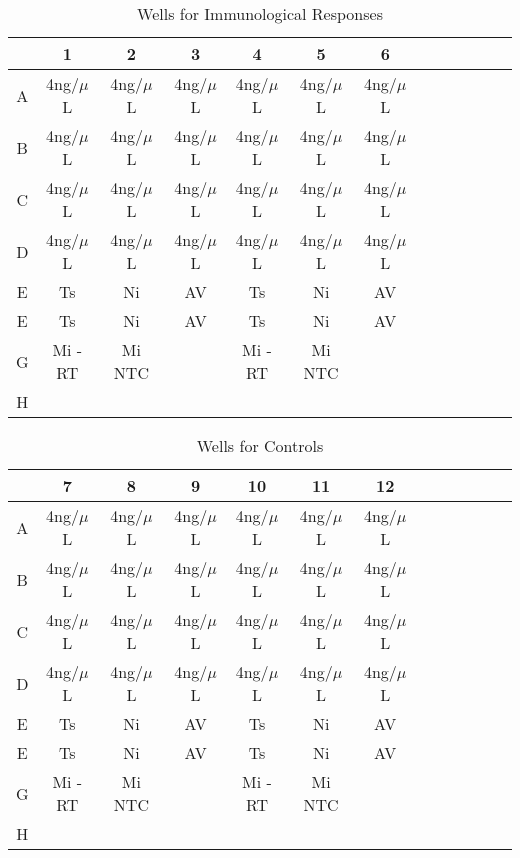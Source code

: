 \documentclass[journal, a4paper]{IEEEtran}
\begin{document}
  \begin{table}[!hbt]
    \begin{center}
    \caption{Wells for Immunological Responses}
    \label{tab:simParameters}
    \begin{tabular}{|c|c|c|c|c|c|c|c|c|c|c|c|c|}
      \hline
      & 1 & 2 & 3 & 4 & 5 & 6\\
      \hline
      A & 4ng/$\mu$L & 4ng/$\mu$L & 4ng/$\mu$L & 4ng/$\mu$L & 4ng/$\mu$L & 4ng/$\mu$L\\
      \hline
      B & 4ng/$\mu$L & 4ng/$\mu$L & 4ng/$\mu$L & 4ng/$\mu$L & 4ng/$\mu$L & 4ng/$\mu$L\\
      \hline
      C & 4ng/$\mu$L & 4ng/$\mu$L & 4ng/$\mu$L & 4ng/$\mu$L & 4ng/$\mu$L & 4ng/$\mu$L\\
      \hline
      D & 4ng/$\mu$L & 4ng/$\mu$L & 4ng/$\mu$L & 4ng/$\mu$L & 4ng/$\mu$L & 4ng/$\mu$L\\
      \hline
      E & Ts & Ni & AV & Ts & Ni & AV\\
      \hline
      E & Ts & Ni & AV & Ts & Ni & AV\\
      \hline
      G & Mi -RT & Mi NTC & & Mi -RT & Mi NTC & \\
      \hline
      H & & & & & &\\
      \hline
    \end{tabular}
    \end{center}
  \end{table}

  \begin{table}[!hbt]
    \begin{center}
    \caption{Wells for Controls}
    \label{tab:simParameters}
    \begin{tabular}{|c|c|c|c|c|c|c|c|c|c|c|c|c|}
      \hline
      & 7 & 8 & 9 & 10 & 11 & 12 \\
      \hline
      A & 4ng/$\mu$L & 4ng/$\mu$L & 4ng/$\mu$L & 4ng/$\mu$L & 4ng/$\mu$L & 4ng/$\mu$L\\
      \hline
      B & 4ng/$\mu$L & 4ng/$\mu$L & 4ng/$\mu$L & 4ng/$\mu$L & 4ng/$\mu$L & 4ng/$\mu$L\\
      \hline
      C & 4ng/$\mu$L & 4ng/$\mu$L & 4ng/$\mu$L & 4ng/$\mu$L & 4ng/$\mu$L & 4ng/$\mu$L\\
      \hline
      D & 4ng/$\mu$L & 4ng/$\mu$L & 4ng/$\mu$L & 4ng/$\mu$L & 4ng/$\mu$L & 4ng/$\mu$L\\
      \hline
      E & Ts & Ni & AV & Ts & Ni & AV\\
      \hline
      E & Ts & Ni & AV & Ts & Ni & AV\\
      \hline
      G & Mi -RT & Mi NTC & & Mi -RT & Mi NTC & \\
      \hline
      H & & & & & &\\
      \hline
    \end{tabular}
    \end{center}
  \end{table}
\end{document}
